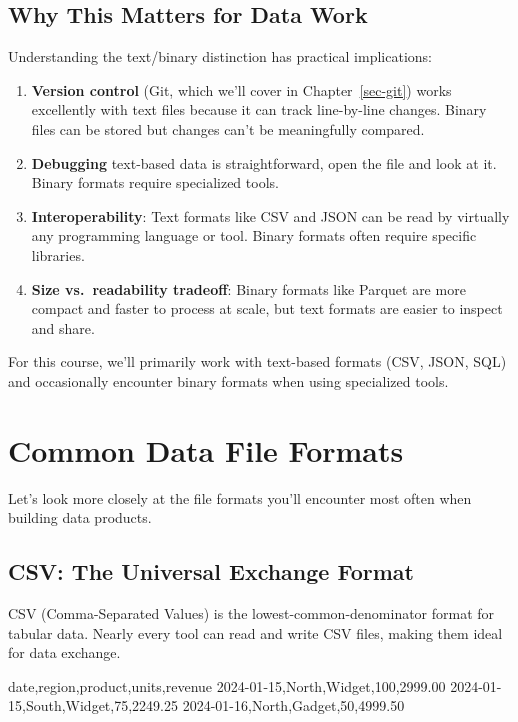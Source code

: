 \documentclass[
  letterpaper,
  DIV=11,
  numbers=noendperiod]{scrreprt}
\newenvironment{Shaded}{\begin{snugshade}}{\end{snugshade}}
\newcommand{\NormalTok}[1]{\textcolor[rgb]{0.00,0.23,0.31}{#1}}
\begin{document}
\subsection{Why This Matters for Data
Work}\label{why-this-matters-for-data-work}

Understanding the text/binary distinction has practical implications:

\begin{enumerate}
\def\labelenumi{\arabic{enumi}.}
\item
  \textbf{Version control} (Git, which we'll cover in
  Chapter~\ref{sec-git}) works excellently with text files because it
  can track line-by-line changes. Binary files can be stored but changes
  can't be meaningfully compared.
\item
  \textbf{Debugging} text-based data is straightforward, open the file
  and look at it. Binary formats require specialized tools.
\item
  \textbf{Interoperability}: Text formats like CSV and JSON can be read
  by virtually any programming language or tool. Binary formats often
  require specific libraries.
\item
  \textbf{Size vs.~readability tradeoff}: Binary formats like Parquet
  are more compact and faster to process at scale, but text formats are
  easier to inspect and share.
\end{enumerate}

For this course, we'll primarily work with text-based formats (CSV,
JSON, SQL) and occasionally encounter binary formats when using
specialized tools.

\section{Common Data File Formats}\label{common-data-file-formats}

Let's look more closely at the file formats you'll encounter most often
when building data products.

\subsection{CSV: The Universal Exchange
Format}\label{csv-the-universal-exchange-format}

CSV (Comma-Separated Values) is the lowest-common-denominator format for
tabular data. Nearly every tool can read and write CSV files, making
them ideal for data exchange.

\begin{codelisting}

\caption{\texttt{sales.csv}}

\begin{Shaded}
\begin{Highlighting}[]
\NormalTok{date,region,product,units,revenue}
\NormalTok{2024{-}01{-}15,North,Widget,100,2999.00}
\NormalTok{2024{-}01{-}15,South,Widget,75,2249.25}
\NormalTok{2024{-}01{-}16,North,Gadget,50,4999.50}
\end{Highlighting}
\end{Shaded}

\end{codelisting}
\end{document}
